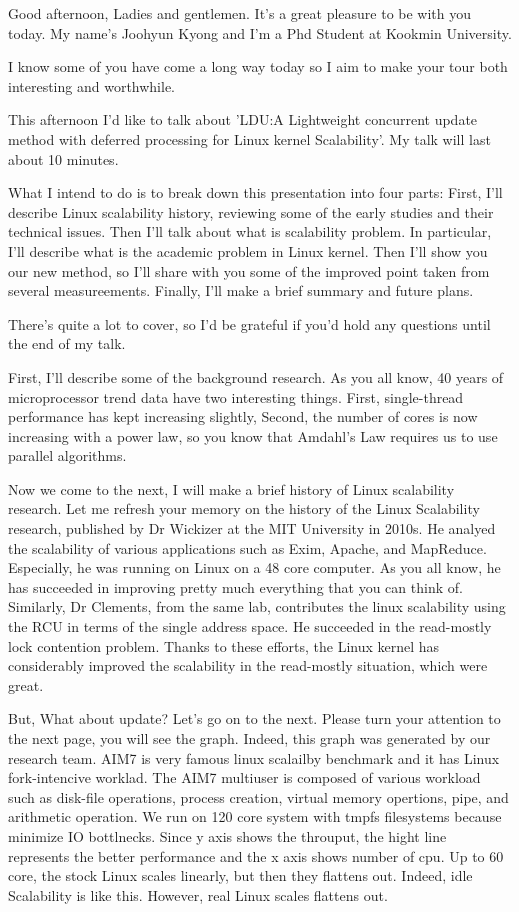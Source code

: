Good afternoon, Ladies and gentlemen. 
It's a great pleasure to be with you today.
My name's Joohyun Kyong and I'm a Phd Student at Kookmin University.

I know some of you have come a long way today so I aim to make your tour both 
interesting and worthwhile.

This afternoon I'd like to talk about 'LDU:A Lightweight concurrent update
method with deferred processing for Linux kernel Scalability'.
My talk will last about 10 minutes.

What I intend to do is to break down this presentation into four parts: 
First, I'll describe Linux scalability history, reviewing some of the early
studies and their technical issues.
Then I'll talk about what is scalability problem.
In particular, I'll describe what is the academic problem in Linux kernel.
Then I'll show you our new method, so I'll share with you some of the
improved point taken from several measureements. 
Finally, I'll make a brief summary and future plans.

There's quite a lot to cover, so I'd be grateful if you'd hold any questions
until the end of my talk.

First, I'll describe some of the background research.
As you all know, 40 years of microprocessor trend data have two interesting
things.
First, single-thread performance has kept increasing slightly, 
Second, the number of cores is now increasing with a power law, so you 
know that Amdahl's Law requires us to use parallel algorithms. 

Now we come to the next, I will make a brief history of Linux
scalability research.
Let me refresh your memory on the history of the Linux Scalability research,
published by Dr Wickizer at the MIT University in 2010s. 
He analyed the scalability of various applications such as Exim, Apache, and
MapReduce.
Especially, he was running on Linux on a 48 core computer.
As you all know, he has succeeded in improving pretty much everything that you
can think of.
Similarly, Dr Clements, from the same lab, contributes the linux scalability
using the RCU in terms of the single address space.
He succeeded in the read-mostly lock contention problem.
Thanks to these efforts, the Linux kernel has considerably improved the
scalability in the read-mostly situation, which were great.

But, What about update? Let's go on to the next.
Please turn your attention to the next page, you will see the graph.
Indeed, this graph was generated by our research team.
AIM7 is very famous linux scalailby benchmark and it has Linux fork-intencive
worklad.
The AIM7 multiuser is composed of various workload such as disk-file operations,
process creation, virtual memory opertions, pipe, and arithmetic operation.
We run on 120 core system with tmpfs filesystems because minimize IO bottlnecks.
Since y axis shows the throuput, the hight line represents the better
performance and the x axis shows number of cpu.
Up to 60 core, the stock Linux scales linearly, but then they flattens out.
Indeed, idle Scalability is like this.
However, real Linux scales flattens out.

